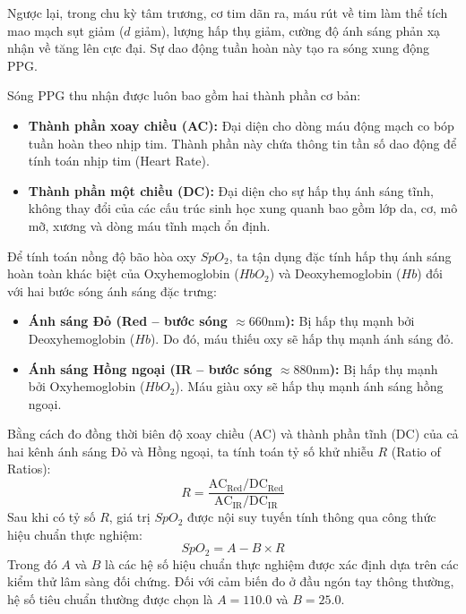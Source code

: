 Ngược lại, trong chu kỳ tâm trương, cơ tim dãn ra, máu rút về tim làm thể tích mao mạch sụt giảm ($d$ giảm), lượng hấp thụ giảm, cường độ ánh sáng phản xạ nhận về tăng lên cực đại. Sự dao động tuần hoàn này tạo ra sóng xung động PPG. 

Sóng PPG thu nhận được luôn bao gồm hai thành phần cơ bản:
\begin{itemize}
    \item \textbf{Thành phần xoay chiều (AC):} Đại diện cho dòng máu động mạch co bóp tuần hoàn theo nhịp tim. Thành phần này chứa thông tin tần số dao động để tính toán nhịp tim (Heart Rate).
    \item \textbf{Thành phần một chiều (DC):} Đại diện cho sự hấp thụ ánh sáng tĩnh, không thay đổi của các cấu trúc sinh học xung quanh bao gồm lớp da, cơ, mô mỡ, xương và dòng máu tĩnh mạch ổn định.
\end{itemize}

Để tính toán nồng độ bão hòa oxy $SpO_2$, ta tận dụng đặc tính hấp thụ ánh sáng hoàn toàn khác biệt của Oxyhemoglobin ($HbO_2$) và Deoxyhemoglobin ($Hb$) đối với hai bước sóng ánh sáng đặc trưng:
\begin{itemize}
    \item \textbf{Ánh sáng Đỏ (Red -- bước sóng $\approx 660\text{nm}$):} Bị hấp thụ mạnh bởi Deoxyhemoglobin ($Hb$). Do đó, máu thiếu oxy sẽ hấp thụ mạnh ánh sáng đỏ.
    \item \textbf{Ánh sáng Hồng ngoại (IR -- bước sóng $\approx 880\text{nm}$):} Bị hấp thụ mạnh bởi Oxyhemoglobin ($HbO_2$). Máu giàu oxy sẽ hấp thụ mạnh ánh sáng hồng ngoại.
\end{itemize}

Bằng cách đo đồng thời biên độ xoay chiều (AC) và thành phần tĩnh (DC) của cả hai kênh ánh sáng Đỏ và Hồng ngoại, ta tính toán tỷ số khử nhiễu $R$ (Ratio of Ratios):
\begin{equation}
    R = \frac{\text{AC}_{\text{Red}} / \text{DC}_{\text{Red}}}{\text{AC}_{\text{IR}} / \text{DC}_{\text{IR}}}
\end{equation}
Sau khi có tỷ số $R$, giá trị $SpO_2$ được nội suy tuyến tính thông qua công thức hiệu chuẩn thực nghiệm:
\begin{equation}
    SpO_2 = A - B \times R
\end{equation}
Trong đó $A$ và $B$ là các hệ số hiệu chuẩn thực nghiệm được xác định dựa trên các kiểm thử lâm sàng đối chứng. Đối với cảm biến đo ở đầu ngón tay thông thường, hệ số tiêu chuẩn thường được chọn là $A = 110.0$ và $B = 25.0$.

